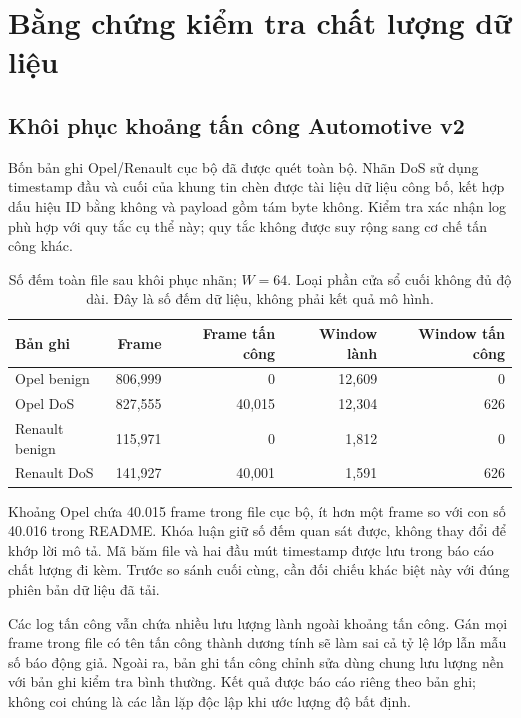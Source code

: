 \documentclass[12pt,a4paper,oneside,openany]{extbook}
\begin{document}
\section{Bằng chứng kiểm tra chất lượng dữ liệu}
\subsection{Khôi phục khoảng tấn công Automotive v2}
Bốn bản ghi Opel/Renault cục bộ đã được quét toàn bộ. Nhãn DoS sử dụng timestamp đầu và cuối của khung tin chèn được tài liệu dữ liệu công bố, kết hợp dấu hiệu ID bằng không và payload gồm tám byte không. Kiểm tra xác nhận log phù hợp với quy tắc cụ thể này; quy tắc không được suy rộng sang cơ chế tấn công khác.

\begin{table}[htbp]\centering\small
\caption{Số đếm toàn file sau khôi phục nhãn; $W=64$. Loại phần cửa sổ cuối không đủ độ dài. Đây là số đếm dữ liệu, không phải kết quả mô hình.}\label{tab:quality}
\begin{tabular}{lrrrr}\toprule
Bản ghi & Frame & Frame tấn công & Window lành & Window tấn công\\\midrule

Opel benign & 806,999 & 0 & 12,609 & 0 \\
Opel DoS & 827,555 & 40,015 & 12,304 & 626 \\
Renault benign & 115,971 & 0 & 1,812 & 0 \\
Renault DoS & 141,927 & 40,001 & 1,591 & 626 \\
\bottomrule
\end{tabular}
\end{table}

Khoảng Opel chứa 40.015 frame trong file cục bộ, ít hơn một frame so với con số 40.016 trong README. Khóa luận giữ số đếm quan sát được, không thay đổi để khớp lời mô tả. Mã băm file và hai đầu mút timestamp được lưu trong báo cáo chất lượng đi kèm. Trước so sánh cuối cùng, cần đối chiếu khác biệt này với đúng phiên bản dữ liệu đã tải.

Các log tấn công vẫn chứa nhiều lưu lượng lành ngoài khoảng tấn công. Gán mọi frame trong file có tên tấn công thành dương tính sẽ làm sai cả tỷ lệ lớp lẫn mẫu số báo động giả. Ngoài ra, bản ghi tấn công chỉnh sửa dùng chung lưu lượng nền với bản ghi kiểm tra bình thường. Kết quả được báo cáo riêng theo bản ghi; không coi chúng là các lần lặp độc lập khi ước lượng độ bất định.
\end{document}
